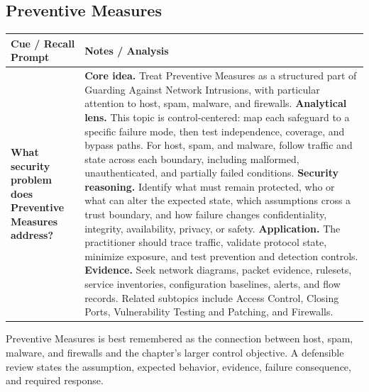 \documentclass[11pt]{article}
\newcommand{\CornellHeader}{%
\rowcolor{Navy}\color{white}\bfseries Cue / Recall Prompt & \color{white}\bfseries Notes / Analysis\\\hline}
\newcommand{\CornellRow}[2]{%
\cellcolor{CueGray}\RaggedRight\textbf{#1} & \RaggedRight #2\\\hline}
\begin{document}
\subsection*{Preventive Measures}
\begin{longtable}{>{\RaggedRight\arraybackslash}p{}|>{\RaggedRight\arraybackslash}p{}}
\CornellHeader
\CornellRow{What security problem does Preventive Measures address?}{\textbf{Core idea.} Treat Preventive Measures as a structured part of Guarding Against Network Intrusions, with particular attention to host, spam, malware, and firewalls. \textbf{Analytical lens.} This topic is control-centered: map each safeguard to a specific failure mode, then test independence, coverage, and bypass paths. For host, spam, and malware, follow traffic and state across each boundary, including malformed, unauthenticated, and partially failed conditions. \textbf{Security reasoning.} Identify what must remain protected, who or what can alter the expected state, which assumptions cross a trust boundary, and how failure changes confidentiality, integrity, availability, privacy, or safety. \textbf{Application.} The practitioner should trace traffic, validate protocol state, minimize exposure, and test prevention and detection controls. \textbf{Evidence.} Seek network diagrams, packet evidence, rulesets, service inventories, configuration baselines, alerts, and flow records. Related subtopics include Access Control, Closing Ports, Vulnerability Testing and Patching, and Firewalls.}
\end{longtable}
\begin{topicsummary}
Preventive Measures is best remembered as the connection between host, spam, malware, and firewalls and the chapter's larger control objective. A defensible review states the assumption, expected behavior, evidence, failure consequence, and required response.
\end{topicsummary}
\end{document}
